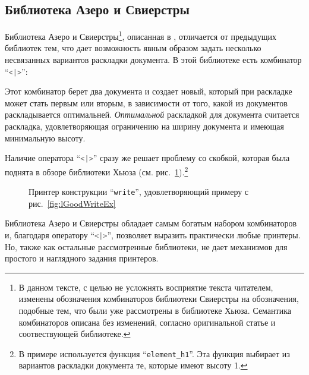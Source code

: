 \newpage

\subsection{Библиотека Азеро и Свиерстры}

Библиотека Азеро и Свиерстры\footnote{
В данном тексте, с целью не усложнять восприятие текста читателем, изменены обозначения комбинаторов библиотеки Свиерстры на обозначения, подобные тем, что были уже рассмотрены в библиотеке Хьюза. Семантика комбинаторов описана без изменений, согласно оригинальной статье и соотвествующей библиотеке.
}, описанная в \cite{swierstra}, отличается от предыдущих библиотек тем, что дает возможность явным образом задать несколько несвязанных вариантов раскладки документа. В этой библиотеке есть комбинатор “\lstinline[language=Haskell]{<|>}”:



Этот комбинатор берет два документа и создает новый, который при раскладке может стать первым или вторым, в зависимости от того, какой из документов раскладывается оптимальней. \textit{Оптимальной} раскладкой для документа считается раскладка, удовлетворяющая ограничению на ширину документа и имеющая минимальную высоту.

Наличие оператора “\lstinline[language=Haskell]{<|>}” сразу же решает проблему со скобкой, которая была поднята в обзоре библиотеки Хьюза (см. рис.~\ref{fig:bracketSwierstra}).\footnote{
	В примере используется функция “\lstinline[language=Haskell]{element_h1}”. Эта функция выбирает из вариантов раскладки документа те, которые имеют высоту 1.
}

\begin{figure}[h!]
	
	\caption{Принтер конструкции “\lstinline{write}”, удовлетворяющий примеру с рис.~\ref{fig:lGoodWriteEx}}
	\label{fig:bracketSwierstra}
\end{figure}

Библиотека Азеро и Свиерстры обладает самым богатым набором комбинаторов и, благодаря оператору “\lstinline[language=Haskell]{<|>}”, позволяет выразить практически любые принтеры. Но, также как остальные рассмотренные библиотеки, не дает механизмов для простого и наглядного задания принтеров.